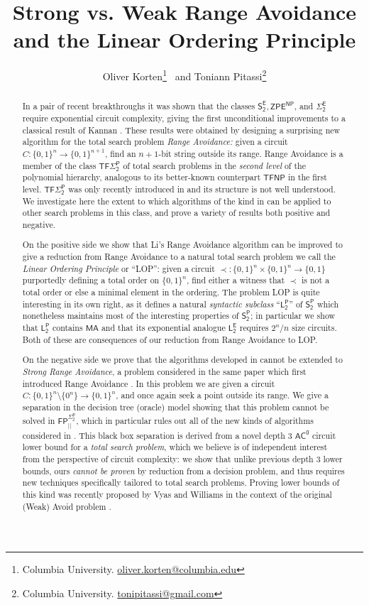\documentclass[11pt]{article}
\author{Oliver Korten\thanks{Columbia University. \href{mailto:oliver.korten@columbia.edu}{oliver.korten@columbia.edu} } ~and Toniann Pitassi\thanks{Columbia University. \href{mailto:tonipitassi@gmail.com}{tonipitassi@gmail.com}}}
\title{Strong vs. Weak Range Avoidance and the Linear Ordering Principle}
\newcommand{\B}{\{0,1\}}
\begin{document}
\maketitle
\begin{abstract}
In a pair of recent breakthroughs \cite{CHR,Li} it was shown that the classes $\mathsf{S_2^E}, \mathsf{ZPE^{NP}}$, and $\mathsf{\Sigma_2^E}$ require exponential circuit complexity, giving the first unconditional improvements to a classical result of Kannan \cite{Kannan}. These results were obtained by designing a surprising new algorithm for the total search problem \emph{Range Avoidance:} given a circuit $C: \B^n \to \B^{n+1}$, find an $n+1$-bit string outside its range. Range Avoidance is a member of the class $\mathsf{TF\Sigma_2^P}$ of total search problems in the \emph{second level} of the polynomial hierarchy, analogous to its better-known counterpart $\mathsf{TFNP}$ in the first level. $\mathsf{TF\Sigma_2^P}$ was only recently introduced in \cite{KKMP} and its structure is not well understood. We investigate here the extent to which algorithms of the kind in \cite{CHR,Li} can be applied to other search problems in this class, and prove a variety of results both positive and negative.

On the positive side we show that Li's Range Avoidance algorithm \cite{Li} can be improved to give a reduction from Range Avoidance to a natural total search problem we call the \emph{Linear Ordering Principle} or ``LOP'': given a circuit $\prec:\B^n \times \B^n \to \B$ purportedly defining a total order on $\B^n$, find either a witness that $\prec$ is not a total order or else a minimal element in the ordering. The problem LOP is quite interesting in its own right, as it defines a natural \emph{syntactic subclass} ``$\mathsf{L_2^P}$'' of $\mathsf{S_2^P}$ which nonetheless maintains most of the interesting properties of $\mathsf{S_2^P}$; in particular we show that $\mathsf{L_2^P}$ contains $\mathsf{MA}$ and that its exponential analogue $\mathsf{L_2^E}$ requires $2^n/n$ size circuits. Both of these are consequences of our reduction from Range Avoidance to LOP.

On the negative side we prove that the algorithms developed in \cite{CHR,Li} cannot be extended to \emph{Strong Range Avoidance}, a problem considered in the same paper which first introduced Range Avoidance \cite{KKMP}. In this problem we are given a circuit $C: \B^n \setminus\{0^n\} \to \B^n$, and once again seek a point outside its range. We give a separation in the decision tree (oracle) model showing that this problem cannot be solved in $\mathsf{FP^{\Sigma_2^P}_{||}}$, which in particular rules out all of the new kinds of algorithms considered in \cite{CHR,Li}. This black box separation is derived from a novel depth 3 $\mathsf{AC^0}$ circuit lower bound for a \emph{total search problem}, which we believe is of independent interest from the perspective of circuit complexity: we show that unlike previous depth 3 lower bounds, ours \emph{cannot be proven} by reduction from a decision problem, and thus requires new techniques specifically tailored to total search problems. Proving lower bounds of this kind was recently proposed by Vyas and Williams in the context of the original (Weak) Avoid problem \cite{vyas-williams}.
\end{abstract}
\end{document}
